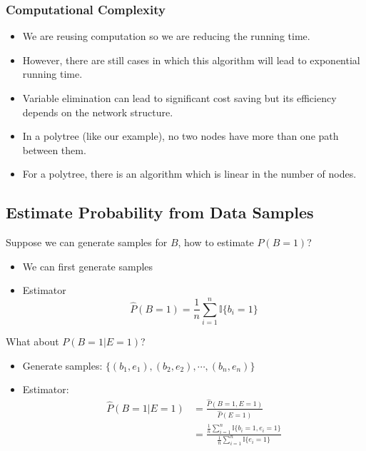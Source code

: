 \documentclass[10pt]{article}
\begin{document}
\subsubsection*{Computational Complexity}
\begin{itemize}
	\item We are reusing computation so we are reducing the running time.
	\item However, there are still cases in which this algorithm will lead to exponential running time.
    \item Variable elimination can lead to significant cost saving but its efficiency depends on the network structure.
    \item In a polytree (like our example), no two nodes have more than one path between them.
    \item For a polytree, there is an algorithm which is linear in the number of nodes.
\end{itemize}

\subsection*{Estimate Probability from Data Samples}
Suppose we can generate samples for $B$, how to estimate $P(B = 1)$?
\begin{itemize}
	\item We can first generate samples
	\item Estimator
	\[\hat{P} (B = 1) = \frac{1}{n} \sum_{i = 1}^n \mathbb{I} \{b_i = 1\}\]
\end{itemize}
What about $P(B = 1 | E = 1)$?
\begin{itemize}
	\item Generate samples: $\{(b_1, e_1), (b_2, e_2), \cdots, (b_n, e_n)\}$
	\item Estimator:
	\begin{align*}
        \hat{P} (B = 1 | E = 1) &= \frac{\hat{P} (B = 1, E = 1)}{\hat{P}(E = 1)} \\
        &= \frac{\frac{1}{n} \sum_{i = 1}^n \mathbb{I} \{b_i = 1, e_i = 1\}}{\frac{1}{n} \sum_{i = 1}^n \mathbb{I} \{e_i = 1\}}
    \end{align*}
\end{itemize}
\end{document}
